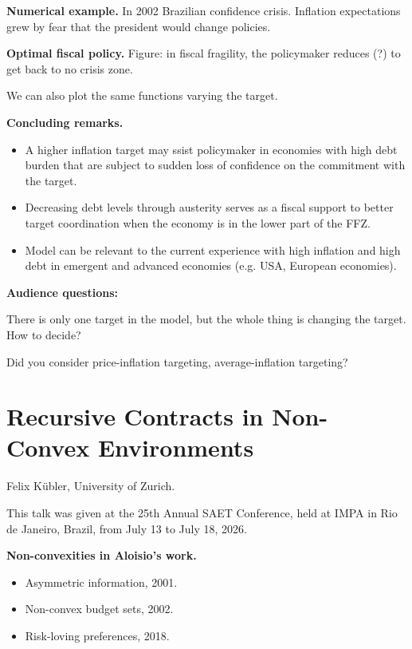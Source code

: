 \medskip\noindent
{\bf Numerical example.}
In 2002 Brazilian confidence crisis.
Inflation expectations grew by
fear that the president would change
policies.

\noindent
{\bf Optimal fiscal policy.}
Figure: in fiscal fragility, the policymaker
reduces (?) to get back to no crisis zone.

We can also plot the same functions varying
the target.

\medskip\noindent
{\bf Concluding remarks.}
\begin{itemize}
\item A higher inflation target may ssist
policymaker in economies with high debt
burden that are subject to sudden loss
of confidence on the commitment with the
target.

\item Decreasing debt levels through
austerity serves as a fiscal support to
better target coordination when the economy
is in the lower part of the FFZ.

\item Model can be relevant to the current
experience with high inflation and high debt
in emergent and advanced economies (e.g.
USA, European economies).
\end{itemize}

\medskip\noindent
{\bf Audience questions:} 

There is only
one target in the model, but the whole thing
is changing the target. How to decide?


Did you consider
price-inflation targeting, average-inflation
targeting?

\section{Recursive Contracts in
Non-Convex Environments}
\label{section-recursive-contracts}

\medskip\noindent
Felix Kübler,
University of Zurich.

\medskip\noindent
This talk was given at the 25th Annual
SAET Conference, held at IMPA in Rio de
Janeiro, Brazil, from July 13 to
July 18, 2026.

\medskip\noindent
{\bf Non-convexities in Aloisio's work.}
\begin{itemize}
\item Asymmetric information, 2001.
\item Non-convex budget sets, 2002.
\item Risk-loving preferences, 2018.
\end{itemize}


